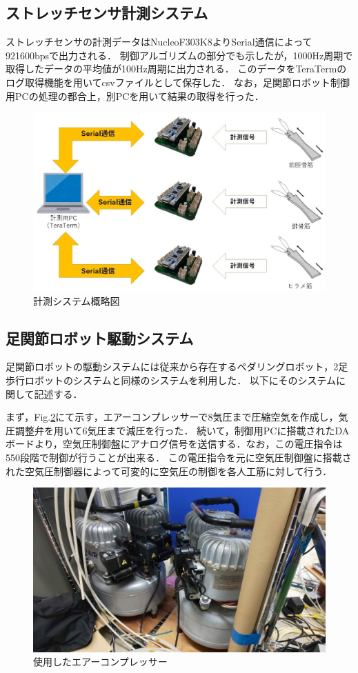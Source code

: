 \subsection{ストレッチセンサ計測システム}
ストレッチセンサの計測データはNucleoF303K8よりSerial通信によって921600bpsで出力される．
制御アルゴリズムの部分でも示したが，1000Hz周期で取得したデータの平均値が100Hz周期に出力される．
このデータをTeraTermのログ取得機能を用いてcsvファイルとして保存した．
なお，足関節ロボット制御用PCの処理の都合上，別PCを用いて結果の取得を行った．
\begin{figure}[h]
    \begin{center}
        \includegraphics[width=0.78\columnwidth,clip]{./3_analysis/getSystem.eps}
        \caption{計測システム概略図}
        \label{getSystem}
    \end{center}
\end{figure}

\subsection{足関節ロボット駆動システム}
足関節ロボットの駆動システムには従来から存在するペダリングロボット，2足歩行ロボットのシステムと同様のシステムを利用した．
以下にそのシステムに関して記述する．

まず，Fig.\ref{fig:compressor}にて示す，エアーコンプレッサーで8気圧まで圧縮空気を作成し，気圧調整弁を用いて6気圧まで減圧を行った．
続いて，制御用PCに搭載されたDAボードより，空気圧制御盤にアナログ信号を送信する．なお，この電圧指令は550段階で制御が行うことが出来る．
この電圧指令を元に空気圧制御盤に搭載された空気圧制御器によって可変的に空気圧の制御を各人工筋に対して行う．

\begin{figure}[h]
    \begin{center}
     \includegraphics[width=0.65\columnwidth,clip]{./3_analysis/compressor.eps}
     \caption{使用したエアーコンプレッサー}
     \label{fig:compressor}
    \end{center}
\end{figure}

